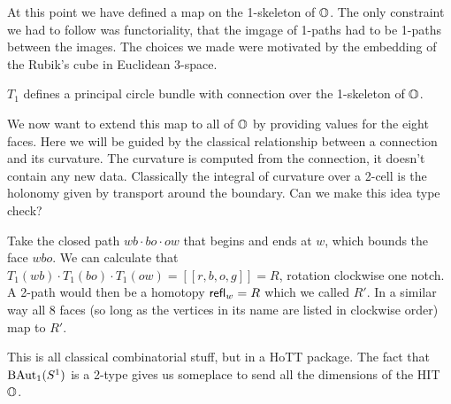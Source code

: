 \documentclass[12pt]{article}
\begin{document}
At this point we have defined a map on the 1-skeleton of \( \mathbb{O} \). The only constraint we had to follow was functoriality, that the imgage of 1-paths had to be 1-paths between the images. The choices we made were motivated by the embedding of the Rubik's cube in Euclidean 3-space.

\begin{myclaim}
\( T_1 \) defines a principal circle bundle with connection over the 1-skeleton of \( \mathbb{O} \).
\end{myclaim}

We now want to extend this map to all of \( \mathbb{O} \) by providing values for the eight faces. Here we will be guided by the classical relationship between a connection and its curvature. The curvature is computed from the connection, it doesn't contain any new data. Classically the integral of curvature over a 2-cell is the holonomy given by transport around the boundary. Can we make this idea type check?

Take the closed path \( wb\cdot bo\cdot ow \) that begins and ends at \( w \), which bounds the face \( wbo \). We can calculate that \( T_1(wb)\cdot T_1(bo)\cdot T_1(ow) = [[r, b, o, g]] = R \), rotation clockwise one notch. A 2-path would then be a homotopy \( \mathsf{refl}_w=R \) which we called \( R' \). In a similar way all 8 faces (so long as the vertices in its name are listed in clockwise order) map to \( R' \).

This is all classical combinatorial stuff, but in a HoTT package. The fact that \( \mathrm{BAut}_1(S^1) \) is a 2-type gives us someplace to send all the dimensions of the HIT \( \mathbb{O} \). 

\end{document}
